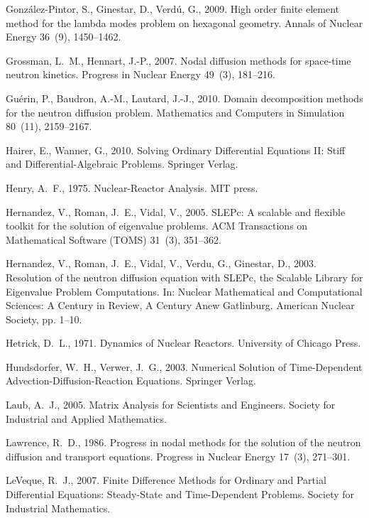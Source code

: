 \documentclass[a4paper]{jpconf}
\begin{document}
\begin{thebibliography}{50}
Gonz{\'a}lez-Pintor, S., Ginestar, D., Verd{\'u}, G., 2009. High order finite
  element method for the lambda modes problem on hexagonal geometry. Annals of
  Nuclear Energy 36~(9), 1450--1462.

Grossman, L.~M., Hennart, J.-P., 2007. Nodal diffusion methods for space-time
  neutron kinetics. Progress in Nuclear Energy 49~(3), 181--216.

Gu{\'e}rin, P., Baudron, A.-M., Lautard, J.-J., 2010. Domain decomposition
  methods for the neutron diffusion problem. Mathematics and Computers in
  Simulation 80~(11), 2159--2167.

Hairer, E., Wanner, G., 2010. {Solving Ordinary Differential Equations II:
  Stiff and Differential-Algebraic Problems}. Springer Verlag.

Henry, A.~F., 1975. Nuclear-Reactor Analysis. MIT press.

Hernandez, V., Roman, J.~E., Vidal, V., 2005. {SLEPc: A} scalable and flexible
  toolkit for the solution of eigenvalue problems. ACM Transactions on
  Mathematical Software (TOMS) 31~(3), 351--362.

Hernandez, V., Roman, J.~E., Vidal, V., Verdu, G., Ginestar, D., 2003.
  {Resolution of the neutron diffusion equation with SLEPc, the Scalable
  Library for Eigenvalue Problem Computations}. In: Nuclear Mathematical and
  Computational Sciences: A Century in Review, A Century Anew Gatlinburg.
  American Nuclear Society, pp. 1--10.

Hetrick, D.~L., 1971. Dynamics of Nuclear Reactors. University of Chicago
  Press.

Hundsdorfer, W.~H., Verwer, J.~G., 2003. Numerical Solution of Time-Dependent
  Advection-Diffusion-Reaction Equations. Springer Verlag.

Laub, A.~J., 2005. Matrix Analysis for Scientists and Engineers. Society for
  Industrial and Applied Mathematics.

Lawrence, R.~D., 1986. Progress in nodal methods for the solution of the
  neutron diffusion and transport equations. Progress in Nuclear Energy 17~(3),
  271--301.

LeVeque, R.~J., 2007. Finite Difference Methods for Ordinary and Partial
  Differential Equations: Steady-State and Time-Dependent Problems. Society for
  Industrial Mathematics.


\end{thebibliography}
\end{document}

